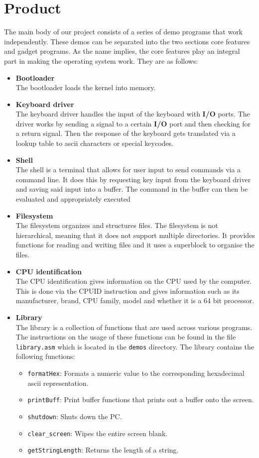 \section{Product}

The main body of our project consists of a series of demo programs that work independently.
These demos can be separated into the two sections core features and gadget programs.
As the name implies, the core features play an integral part in making the operating
system work. They are as follows:


\begin{itemize}

\item \textbf{Bootloader} \\
The bootloader loads the kernel into memory.
\item \textbf{Keyboard driver} \\
The keyboard driver handles the input of the keyboard with \textbf{I/O} ports. The driver works
by sending a signal to a certain \textbf{I/O} port and then checking for a return signal.
Then the response of the keyboard gets translated via a lookup table to ascii characters
or special keycodes.
\item \textbf{Shell} \\
The shell is a terminal that allows for user input to send commands via a command
line. It does this by requesting key input from the keyboard driver and saving said input
into a buffer. The command in the buffer can then be evaluated and appropriately executed
\item \textbf{Filesystem} \\
The filesystem organizes and structures files. The filesystem is not hierarchical, meaning
that it does not support multiple directories. It provides functions for reading and writing
files and it uses a superblock to organise the files.
\item \textbf{CPU identification} \\
The CPU identification gives information on the CPU used by the computer. This is done via the 
CPUID instruction and gives information such as its manufacturer, brand, CPU family, model and
whether it is a 64 bit processor.
\item \textbf{Library} \\
The library is a collection of functions that are used across various programs. The instructions
on the usage of these functions can be found in the file \texttt{library.asm} which is located
in the \texttt{demos} directory. The library contains the following functions: 
\begin{itemize}
\item \texttt{formatHex}: Formats a numeric value to the corresponding hexadecimal ascii representation.
\item \texttt{printBuff}: Print buffer functions that prints out a buffer onto the screen. 
\item \texttt{shutdown}: Shuts down the PC. 
\item \texttt{clear\_screen}: Wipes the entire screen blank.
\item \texttt{getStringLength}: Returns the length of a string.
\end{itemize}


\end{itemize}
